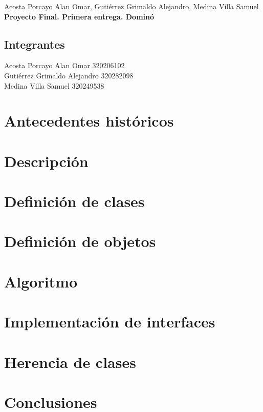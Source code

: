 \documentclass[12pt]{article}
\newcommand{\linejump}{\hfill \break}
\begin{document}
  \begin{center}
    Acosta Porcayo Alan Omar, Gutiérrez Grimaldo Alejandro, Medina Villa Samuel \\
    \linejump
    \LARGE \textbf{Proyecto Final. Primera entrega. Dominó} \\
  \end{center}

  \begin{flushright}
    \section*{Integrantes}
    Acosta Porcayo Alan Omar 320206102 \\
    Gutiérrez Grimaldo Alejandro 320282098 \\
    Medina Villa Samuel 320249538 
  \end{flushright}


  \section*{Antecedentes históricos}
  
  
  \section*{Descripción}


  \section*{Definición de clases}

  
  \section*{Definición de objetos}


  \section*{Algoritmo}


  \section*{Implementación de interfaces}


  \section*{Herencia de clases}


  \section*{Conclusiones}
\end{document}
